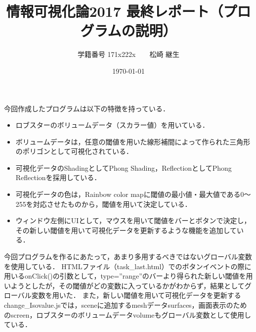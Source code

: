 \documentclass[11pt,a4paper]{jsarticle}
\title{情報可視化論2017 最終レポート（プログラムの説明）}
\author{学籍番号 171x222x　　松崎 継生}
\date{\today}
\begin{document}
\maketitle
%

今回作成したプログラムは以下の特徴を持っている．

\begin{itemize}
\item ロブスターのボリュームデータ（スカラー値）を用いている．
\item ボリュームデータは，任意の閾値を用いた線形補間によって作られた三角形のポリゴンとして可視化されている．
\item 可視化データのShadingとしてPhong Shading，ReflectionとしてPhong Reflectionを採用している．
\item 可視化データの色は，Rainbow color mapに閾値の最小値・最大値である0～255を対応させたものから，閾値を用いて決定している．
\item ウィンドウ左側にUIとして，マウスを用いて閾値をバーとボタンで決定し，その新しい閾値を用いて可視化データを更新するような機能を追加している．
\end{itemize}

今回プログラムを作るにあたって，あまり多用するべきではないグローバル変数を使用している．
HTMLファイル（task\_last.html）でのボタンイベントの際に用いるonClick()の引数として，type=''range''のバーより得られた新しい閾値を用いようとしたが，その閾値がどの変数に入っているかがわからず，結果としてグローバル変数を用いた．
また，新しい閾値を用いて可視化データを更新するchange\_Isovalue.jsでは，sceneに追加するmeshデータsurfaces，画面表示のためのscreen，ロブスターのボリュームデータvolumeもグローバル変数として使用している．

%
%
\end{document}
